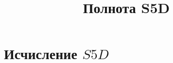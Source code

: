  
\usepackage{expl3, xparse}
\usepackage{ebproof}

\title{Полнота S5D}

  \frame{\titlepage}


\section{Исчисление $S5D$}


